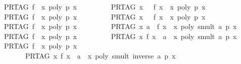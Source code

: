 \begin{isabellebody}
\ \ {\isachardoublequoteopen}PR{\isacharunderscore}TAG\ f\ {\isacharequal}\ {\isacharparenleft}{\isasymlambda}x{\isachardot}\ poly\ p\ x{\isacharparenright}\ {\isasymLongrightarrow}\ \isanewline
\ \ \ \ \ \ \ PR{\isacharunderscore}TAG\ {\isacharparenleft}{\isasymlambda}x{\isachardot}\ {}\ {\isasymle}\ f\ x{\isacharparenright}\ {\isacharequal}\ {\isacharparenleft}{\isasymlambda}x{\isachardot}\ poly\ {\isacharparenleft}{\isacharminus}p{\isacharparenright}\ x\ {\isasymle}\ {}{\isacharparenright}{\isachardoublequoteclose}\isanewline
\ \ {\isachardoublequoteopen}PR{\isacharunderscore}TAG\ f\ {\isacharequal}\ {\isacharparenleft}{\isasymlambda}x{\isachardot}\ poly\ p\ x{\isacharparenright}\ {\isasymLongrightarrow}\ \isanewline
\ \ \ \ \ \ \ PR{\isacharunderscore}TAG\ {\isacharparenleft}{\isasymlambda}x{\isachardot}\ {}\ {\isacharless}\ f\ x{\isacharparenright}\ {\isacharequal}\ {\isacharparenleft}{\isasymlambda}x{\isachardot}\ poly\ {\isacharparenleft}{\isacharminus}p{\isacharparenright}\ x\ {\isacharless}\ {}{\isacharparenright}{\isachardoublequoteclose}\isanewline
\ \ {\isachardoublequoteopen}PR{\isacharunderscore}TAG\ f\ {\isacharequal}\ {\isacharparenleft}{\isasymlambda}x{\isachardot}\ poly\ p\ x{\isacharparenright}\ \isanewline
\ \ \ \ \ \ \ {\isasymLongrightarrow}\ PR{\isacharunderscore}TAG\ {\isacharparenleft}{\isasymlambda}x{\isachardot}\ a\ {\isacharasterisk}\ f\ x{\isacharparenright}\ {\isacharequal}\ {\isacharparenleft}{\isasymlambda}x{\isachardot}\ poly\ {\isacharparenleft}smult\ a\ p{\isacharparenright}\ x{\isacharparenright}{\isachardoublequoteclose}\isanewline
\ \ {\isachardoublequoteopen}PR{\isacharunderscore}TAG\ f\ {\isacharequal}\ {\isacharparenleft}{\isasymlambda}x{\isachardot}\ poly\ p\ x{\isacharparenright}\ \isanewline
\ \ \ \ \ \ \ {\isasymLongrightarrow}\ PR{\isacharunderscore}TAG\ {\isacharparenleft}{\isasymlambda}x{\isachardot}\ f\ x\ {\isacharasterisk}\ a{\isacharparenright}\ {\isacharequal}\ {\isacharparenleft}{\isasymlambda}x{\isachardot}\ poly\ {\isacharparenleft}smult\ a\ p{\isacharparenright}\ x{\isacharparenright}{\isachardoublequoteclose}\isanewline
\ \ {\isachardoublequoteopen}PR{\isacharunderscore}TAG\ f\ {\isacharequal}\ {\isacharparenleft}{\isasymlambda}x{\isachardot}\ poly\ p\ x{\isacharparenright}\ \isanewline
\ \ \ \ \ \ \ {\isasymLongrightarrow}\ PR{\isacharunderscore}TAG\ {\isacharparenleft}{\isasymlambda}x{\isachardot}\ f\ x\ {\isacharslash}\ a{\isacharparenright}\ {\isacharequal}\ {\isacharparenleft}{\isasymlambda}x{\isachardot}\ poly\ {\isacharparenleft}smult\ {\isacharparenleft}inverse\ a{\isacharparenright}\ p{\isacharparenright}\ x{\isacharparenright}{\isachardoublequoteclose}\isanewline

\end{isabellebody}
